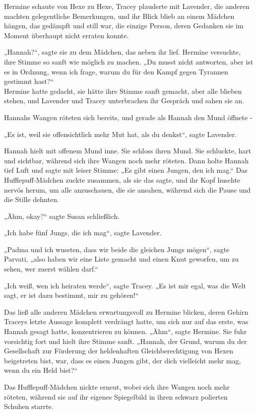 {Hermine schaute von Hexe zu Hexe, Tracey plauderte mit Lavender, die anderen machten gelegentliche Bemerkungen, und ihr Blick blieb an einem Mädchen hängen, das gedämpft und still war, die einzige Person, deren Gedanken sie im Moment überhaupt nicht erraten konnte.

„Hannah?“, sagte sie zu dem Mädchen, das neben ihr lief. Hermine versuchte, ihre Stimme so sanft wie möglich zu machen. „Du musst nicht antworten, aber ist es in Ordnung, wenn ich frage, warum du für den Kampf gegen Tyrannen gestimmt hast?“\\ Hermine hatte gedacht, sie hätte ihre Stimme sanft gemacht, aber alle blieben stehen, und Lavender und Tracey unterbrachen ihr Gespräch und sahen sie an.

Hannahs Wangen röteten sich bereits, und gerade als Hannah den Mund öffnete -

„Es ist, weil sie offensichtlich mehr Mut hat, als du denkst“, sagte Lavender.

Hannah hielt mit offenem Mund inne. Sie schloss ihren Mund. Sie schluckte, hart und sichtbar, während sich ihre Wangen noch mehr röteten. Dann holte Hannah tief Luft und sagte mit leiser Stimme: „Es gibt einen Jungen, den ich mag.“ Das Hufflepuff-Mädchen zuckte zusammen, als sie das sagte, und ihr Kopf huschte nervös herum, um alle anzuschauen, die sie ansahen, während sich die Pause und die Stille dehnten.

„Ähm, okay?“ sagte Susan schließlich.

„Ich habe fünf Jungs, die ich mag“, sagte Lavender.

„Padma und ich wussten, dass wir beide die gleichen Jungs mögen“, sagte Parvati, „also haben wir eine Liste gemacht und einen Knut geworfen, um zu sehen, wer zuerst wählen darf.“

„Ich weiß, wen ich heiraten werde“, sagte Tracey. „Es ist mir egal, was die Welt sagt, er ist dazu bestimmt, mir zu gehören!“

Das ließ alle anderen Mädchen erwartungsvoll zu Hermine blicken, deren Gehirn Traceys letzte Aussage komplett verdrängt hatte, um sich nur auf das erste, was Hannah gesagt hatte, konzentrieren zu können. „Ähm“, sagte Hermine. Sie fuhr vorsichtig fort und hielt ihre Stimme sanft. „Hannah, der Grund, warum du der Gesellschaft zur Förderung der heldenhaften Gleichberechtigung von Hexen beigetreten bist, war, dass es einen Jungen gibt, der dich vielleicht mehr mag, wenn du ein Held bist?“

Das Hufflepuff-Mädchen nickte erneut, wobei sich ihre Wangen noch mehr röteten, während sie auf ihr eigenes Spiegelbild in ihren schwarz polierten Schuhen starrte.

}
